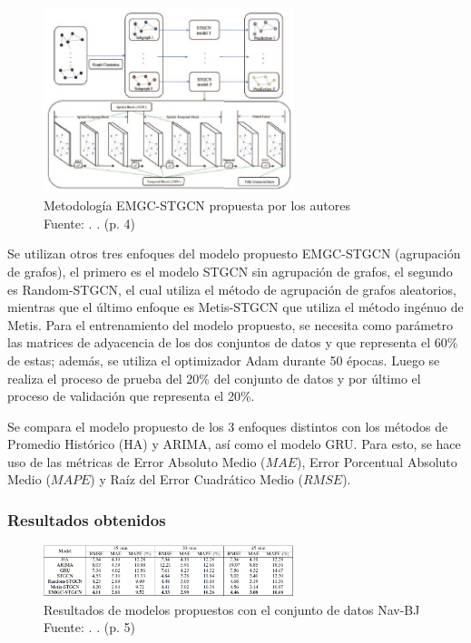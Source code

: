 \begin{figure}[h]
	\begin{center}
		\includegraphics[width=0.65\textwidth]{2/figures/CLUSTER.jpg}
		\caption{Metodología EMGC-STGCN propuesta por los autores \\
			Fuente: \citep*{pr_zhang}. . (p. 4)}
		\label{1:fig2}
	\end{center}
\end{figure}

Se utilizan otros tres enfoques del modelo propuesto EMGC-STGCN (agrupación de grafos), el primero es el modelo STGCN sin agrupación de grafos, el segundo es Random-STGCN, el cual utiliza el método de agrupación de grafos aleatorios, mientras que el último enfoque es Metis-STGCN que utiliza el método ingénuo de Metis. Para el entrenamiento del modelo propuesto, se necesita como parámetro las matrices de adyacencia de los dos conjuntos de datos y que representa el 60\% de estas; además, se utiliza el optimizador Adam durante 50 épocas. Luego se realiza el proceso de prueba del 20\% del conjunto de datos y por último el proceso de validación que representa el 20\%. 

Se compara el modelo propuesto de los 3 enfoques distintos con los métodos de Promedio Histórico (HA) y ARIMA, así como el modelo GRU. Para esto, se hace uso de las métricas de Error Absoluto Medio ($MAE$), Error Porcentual Absoluto Medio ($MAPE$) y Raíz del Error Cuadrático Medio ($RMSE$).

\subsubsection{Resultados obtenidos}
\begin{figure}[h]
	\begin{center}
		\includegraphics[width=0.65\textwidth]{2/figures/clusterRE1.jpg}
		\caption{Resultados de modelos propuestos con el conjunto de datos Nav-BJ \\
			Fuente: \citep*{pr_zhang}. . (p. 5)}
		\label{1:fig2}
	\end{center}
\end{figure}

